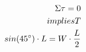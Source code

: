 \documentclass[preview]{standalone}
\begin{document}
\begin{align*}
\special{dvisvgm:raw <g id='unique000'>}\Sigma \tau = 0 \\implies T \\sin(45^{\circ}) \cdot L = W \cdot \frac{L}{2}\special{dvisvgm:raw </g>}
\end{align*}
\end{document}
